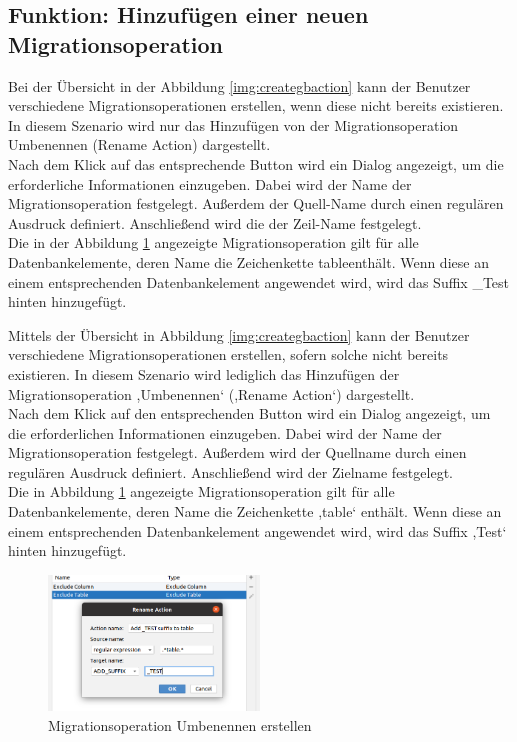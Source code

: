 \subsection{Funktion: Hinzufügen einer neuen Migrationsoperation}
	
	Bei der Übersicht in der Abbildung \ref{img:creategbaction} kann der Benutzer verschiedene Migrationsoperationen erstellen, wenn diese nicht bereits existieren. In diesem Szenario wird nur das Hinzufügen von der Migrationsoperation Umbenennen (Rename Action) dargestellt.\\
	Nach dem Klick auf das entsprechende Button wird ein Dialog angezeigt, um die erforderliche Informationen einzugeben. Dabei wird der Name der Migrationsoperation festgelegt. Außerdem der Quell-Name durch einen regulären Ausdruck definiert. Anschließend  wird die der Zeil-Name festgelegt. \\
	Die in der Abbildung \ref{img:createRename} angezeigte Migrationsoperation gilt für alle Datenbankelemente, deren Name die Zeichenkette \glqq table\grqq enthält. Wenn diese an einem entsprechenden Datenbankelement angewendet wird, wird das Suffix \glqq \_Test\grqq \, hinten hinzugefügt.
	
	
	Mittels der Übersicht in Abbildung  \ref{img:creategbaction} kann der Benutzer verschiedene Migrationsoperationen erstellen, sofern solche nicht bereits existieren. In diesem Szenario wird lediglich das Hinzufügen der Migrationsoperation ,Umbenennen‘ (,Rename Action‘) dargestellt.\\
	Nach dem Klick auf den entsprechenden Button wird ein Dialog angezeigt, um die erforderlichen Informationen einzugeben. Dabei wird der Name der Migrationsoperation festgelegt. Außerdem wird der Quellname durch einen regulären Ausdruck definiert. Anschließend wird der Zielname festgelegt.\\
	Die in Abbildung \ref{img:createRename}  angezeigte Migrationsoperation gilt für alle Datenbankelemente, deren Name die Zeichenkette ,table‘ enthält. Wenn diese an einem entsprechenden Datenbankelement angewendet wird, wird das Suffix ,Test‘ hinten hinzugefügt. 
	

	\begin{figure}[h]
		\centering
		\includegraphics[width=0.5\textwidth]{images/ui/createRename}
		\caption{Migrationsoperation Umbenennen erstellen}
		\label{img:createRename}
	\end{figure}

